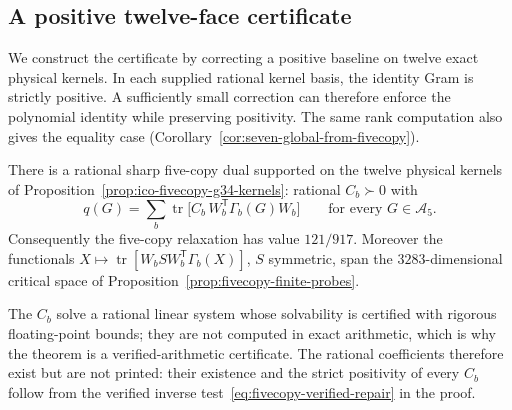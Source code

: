 \subsection{A positive twelve-face certificate}
\label{sec:fivecopy-positive-repair}

We construct the certificate by correcting a positive baseline on twelve exact physical
kernels. In each supplied rational kernel basis, the identity Gram is
strictly positive. A sufficiently small correction can therefore enforce the polynomial
identity while preserving positivity. The same rank computation also gives the equality case
(Corollary~\ref{cor:seven-global-from-fivecopy}).

\begin{theorem}
\label{thm:fivecopy-sharp-certificate}
There is a rational sharp five-copy dual supported on the twelve
physical kernels of Proposition~\ref{prop:ico-fivecopy-g34-kernels}:
rational $C_b\succ0$ with
\[
 q(G)=\sum_b\operatorname{tr}\bigl[C_b\,W_b^{\mathsf T}\Gamma_b(G)W_b\bigr]
 \qquad\text{for every }G\in\mathcal A_5 .
\]
Consequently the five-copy relaxation has value $121/917$. Moreover the
functionals $X\mapsto\operatorname{tr}[W_bSW_b^{\mathsf T}\Gamma_b(X)]$,
$S$ symmetric, span the $3283$-dimensional critical space of
Proposition~\ref{prop:fivecopy-finite-probes}.
\end{theorem}
The $C_b$ solve a rational linear system whose solvability is certified with rigorous floating-point bounds;
they are not computed in exact arithmetic, which is why the theorem is a verified-arithmetic certificate.
The rational coefficients therefore exist but are not printed: their existence and the strict positivity of every
$C_b$ follow from the verified inverse test~\eqref{eq:fivecopy-verified-repair} in the proof.
